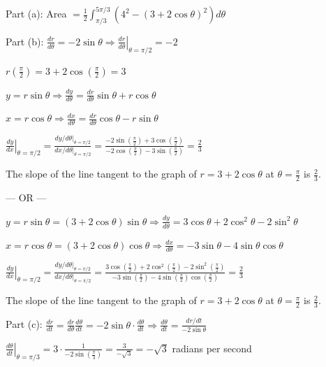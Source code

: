 \documentclass[12pt,addpoints,answers]{exam}
\begin{document}
\begin{questions}
\begin{solution}
Part (a): Area $= \frac{1}{2}\int_{\pi/3}^{5\pi/3} \left(4^2 - (3 + 2\cos\theta)^2\right) d\theta$ \par Part (b): $\frac{dr}{d\theta} = -2\sin\theta \Rightarrow \left.\frac{dr}{d\theta}\right|_{\theta=\pi/2} = -2$ \par $r\left(\frac{\pi}{2}\right) = 3 + 2\cos\left(\frac{\pi}{2}\right) = 3$ \par $y = r\sin\theta \Rightarrow \frac{dy}{d\theta} = \frac{dr}{d\theta}\sin\theta + r\cos\theta$ \par $x = r\cos\theta \Rightarrow \frac{dx}{d\theta} = \frac{dr}{d\theta}\cos\theta - r\sin\theta$ \par $\left.\frac{dy}{dx}\right|_{\theta=\pi/2} = \frac{dy/d\theta\big|_{\theta=\pi/2}}{dx/d\theta\big|_{\theta=\pi/2}} = \frac{-2\sin\left(\frac{\pi}{2}\right) + 3\cos\left(\frac{\pi}{2}\right)}{-2\cos\left(\frac{\pi}{2}\right) - 3\sin\left(\frac{\pi}{2}\right)} = \frac{2}{3}$ \par The slope of the line tangent to the graph of $r = 3 + 2\cos\theta$ at $\theta = \frac{\pi}{2}$ is $\frac{2}{3}$. \par — OR — \par $y = r\sin\theta = (3 + 2\cos\theta)\sin\theta \Rightarrow \frac{dy}{d\theta} = 3\cos\theta + 2\cos^2\theta - 2\sin^2\theta$ \par $x = r\cos\theta = (3 + 2\cos\theta)\cos\theta \Rightarrow \frac{dx}{d\theta} = -3\sin\theta - 4\sin\theta\cos\theta$ \par $\left.\frac{dy}{dx}\right|_{\theta=\pi/2} = \frac{dy/d\theta\big|_{\theta=\pi/2}}{dx/d\theta\big|_{\theta=\pi/2}} = \frac{3\cos\left(\frac{\pi}{2}\right) + 2\cos^2\left(\frac{\pi}{2}\right) - 2\sin^2\left(\frac{\pi}{2}\right)}{-3\sin\left(\frac{\pi}{2}\right) - 4\sin\left(\frac{\pi}{2}\right)\cos\left(\frac{\pi}{2}\right)} = \frac{2}{3}$ \par The slope of the line tangent to the graph of $r = 3 + 2\cos\theta$ at $\theta = \frac{\pi}{2}$ is $\frac{2}{3}$. \par Part (c): $\frac{dr}{dt} = \frac{dr}{d\theta}\frac{d\theta}{dt} = -2\sin\theta \cdot \frac{d\theta}{dt} \Rightarrow \frac{d\theta}{dt} = \frac{dr/dt}{-2\sin\theta}$ \par $\left.\frac{d\theta}{dt}\right|_{\theta=\pi/3} = 3 \cdot \frac{1}{-2\sin\left(\frac{\pi}{3}\right)} = \frac{3}{-\sqrt{3}} = -\sqrt{3}$ radians per second

\end{solution}
\end{questions}
\end{document}
